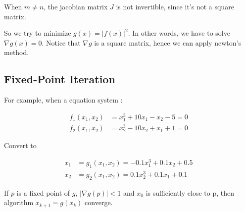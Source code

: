 When $m \neq n$, the jacobian matrix $J$ is not invertible,
since it's not a square matrix.

So we try to minimize $g(x) = |f(x)|^2$. In other words,
we have to solve $\nabla g(x) = 0$. Notice that 
$\nabla g$ is a square matrix, hence we can apply newton's method.

\subsection{Fixed-Point Iteration}

For example, when a equation system :

\begin{align}
  f_1(x_1, x_2) &= x_1^3 + 10x_1 - x_2 - 5 = 0 \nonumber \\
  f_2(x_1, x_2) &= x_2^3 - 10x_2 + x_1 + 1 = 0 \nonumber
\end{align}

Convert to

\begin{align}
  x_1 &= g_1(x_1, x_2) = -0.1x_1^3 + 0.1x_2 + 0.5 \nonumber \\
  x_2 &= g_2(x_1, x_2) = 0.1x_2^3 + 0.1x_1 + 0.1 \nonumber
\end{align}

\begin{theorem}
  If $p$ is a fixed point of $g$, $|\nabla g(p)| < 1$ and $x_0$ is sufficiently close to p,
  then algorithm $x_{k+1} = g(x_k)$ converge.
\end{theorem}
